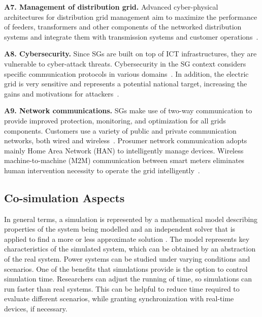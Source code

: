 \documentclass[1p]{elsarticle} %
\begin{document}
\noindent \textbf{A7. Management of distribution grid.} Advanced cyber-physical architectures for distribution grid management aim to maximize the performance of feeders, transformers and other components of the networked distribution systems and integrate them with transmission systems and customer operations~\citep{ref:cintuglu2017survey,NIST2010}. 


\noindent \textbf{A8. Cybersecurity.} Since SGs are built on top of ICT infrastructures, they are vulnerable to cyber-attack threats. Cybersecurity in the SG context considers specific communication protocols in various domains~\citep{ref:cintuglu2017survey,NIST2010}. In addition, the electric grid is very sensitive and represents a potential national target, increasing the gains and motivations for attackers~\citep{Wang2013}. %


\noindent \textbf{A9. Network communications.} SGs make use of two-way communication to provide improved protection, monitoring, and optimization for all grids components. Customers use a variety of public and private communication networks, both wired and wireless~\citep{Zaballos}. Prosumer network communication adopts mainly Home Area Network (HAN) to intelligently manage devices. Wireless machine-to-machine (M2M) communication between smart meters eliminates human intervention necessity to operate the grid intelligently~\citep{ref:cintuglu2017survey,NIST2010}. 



\subsection{Co-simulation Aspects}
\label{sec:co-sim-aspects}
In general terms, a simulation is represented by a mathematical model describing properties of the system being modelled and an independent solver that is applied to find a more or less approximate solution \citep{ref:vogt2018survey}. The model represents key characteristics of the simulated system, which can be obtained by an abstraction of the real system. Power systems can be studied under varying conditions and scenarios. One of the benefits that simulations provide is the option to control simulation time. Researchers can adjust the running of time, so simulations can run faster than real systems. This can be helpful to reduce time required to evaluate different scenarios, while granting synchronization with real-time devices, if necessary.
\end{document}
